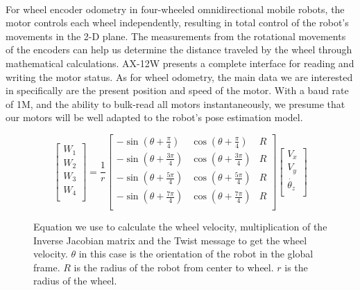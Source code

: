 \paragraph*{}
For wheel encoder odometry in four-wheeled omnidirectional mobile robots, the motor controls each wheel independently, resulting in total control of the robot's movements in the 2-D plane. The measurements from the rotational movements of the encoders can help us determine the distance traveled by the wheel through mathematical calculations. 
AX-12W presents a complete interface for reading and writing the motor status. As for wheel odometry, the main data we are interested in specifically are the present position and speed of the motor. With a baud rate of 1M, and the ability to bulk-read all motors instantaneously, we presume that our motors will be well adapted to the robot's pose estimation model. 

\begin{figure} [H]
    \[
    \begin{bmatrix}
    W_1\\
    W_2\\
    W_3\\
    W_4\\
    \end{bmatrix}
    =
    \frac{1}{r}
    \begin{bmatrix}
    -\sin(\theta + \frac{\pi}{4})  & \cos(\theta +  \frac{\pi}{4})   & R \\
    -\sin(\theta + \frac{3\pi}{4}) & \cos(\theta +  \frac{3\pi}{4})  & R \\
    -\sin(\theta + \frac{5\pi}{4}) & \cos(\theta +  \frac{5\pi}{4})  & R \\
    -\sin(\theta + \frac{7\pi}{4}) & \cos(\theta +  \frac{7\pi}{4})  & R \\
    \end{bmatrix}
    \begin{bmatrix}
        V_x\\
        V_y\\
        \dot{\theta_z}\\
        \end{bmatrix}
    \]
    \caption{Equation we use to calculate the wheel velocity, multiplication of the Inverse Jacobian matrix and the Twist message to get the wheel velocity. $\theta$ in this case is the orientation of the robot in the global frame. $R$ is the radius of the robot from center to wheel. $r$ is the radius of the wheel.} 
    \label{fig:matrix-wheel}
\end{figure}


